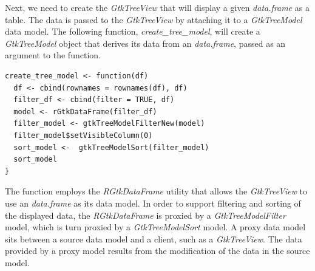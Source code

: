 \documentclass[article]{jss}
\begin{document}
Next, we need to create the \emph{GtkTreeView} that will display a
given \emph{data.frame} as a table.  The data is passed to the
\emph{GtkTreeView} by attaching it to a \emph{GtkTreeModel} data
model. The following function, \emph{create_tree_model}, will create a
\emph{GtkTreeModel} object that derives its data from an 
\emph{data.frame}, passed as an argument to the function. 
\begin{verbatim}
create_tree_model <- function(df)
  df <- cbind(rownames = rownames(df), df)
  filter_df <- cbind(filter = TRUE, df)
  model <- rGtkDataFrame(filter_df)
  filter_model <- gtkTreeModelFilterNew(model)
  filter_model$setVisibleColumn(0)
  sort_model <-  gtkTreeModelSort(filter_model)
  sort_model
}
\end{verbatim}
The function employs the \emph{RGtkDataFrame} utility that allows
the \emph{GtkTreeView} to use an 
\emph{data.frame} as its data model.  In order to support filtering
and sorting of the displayed data, the \emph{RGtkDataFrame} is proxied
by a \emph{GtkTreeModelFilter} model, which is turn proxied by a
\emph{GtkTreeModelSort} model. A proxy data model sits between a
source data model and a client, such as a \emph{GtkTreeView}. The data
provided by a proxy model results from the modification of the data in
the source model.
\end{document}
